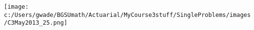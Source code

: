 
\texttt{[image: c:/Users/gwade/BGSUmath/Actuarial/MyCourse3stuff/SingleProblems/images/C3May2013\_25.png]}

\showsol{\bsoln

\esoln}
